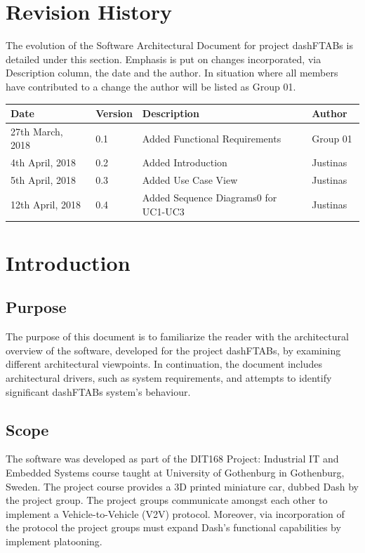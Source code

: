 \documentclass[12pt]{article}
\begin{document}
\section{Revision History}
The evolution of the Software Architectural Document for project dashFTABs is detailed under this section. Emphasis is put on changes incorporated, via Description column, the date and the author. In situation where all members have contributed to a change the author will be listed as Group 01.
\begin{longtable}{ | p{0.25\linewidth} | p{0.1\linewidth} | p{0.5\linewidth} | p{0.15\linewidth} | }\hline 
    Date & Version & Description & Author \\ \hline
    27th March, 2018 & 0.1 & Added Functional Requirements & Group 01\\ \hline
    4th April, 2018 & 0.2 & Added Introduction & Justinas\\ \hline
    5th April, 2018 & 0.3 & Added Use Case View & Justinas\\ \hline
    12th April, 2018 & 0.4 & Added Sequence Diagrams0 for UC1-UC3 & Justinas\\ \hline
\end{longtable}
\pagebreak

\section{Introduction}
\subsection{Purpose}
The purpose of this document is to familiarize the reader with the architectural overview of the software, developed for the project dashFTABs, by examining different architectural viewpoints. In continuation, the document includes architectural drivers, such as system requirements, and attempts to identify significant dashFTABs system’s behaviour.\par

\subsection{Scope}
  The software was developed as part of the DIT168 Project: Industrial IT and Embedded Systems course taught at University of Gothenburg in Gothenburg, Sweden. The project course provides a 3D printed miniature car, dubbed Dash by the project group. The project groups communicate amongst each other to implement a Vehicle-to-Vehicle (V2V) protocol. Moreover, via incorporation of the protocol the project groups must expand Dash’s functional capabilities by implement platooning.\par
\end{document}
